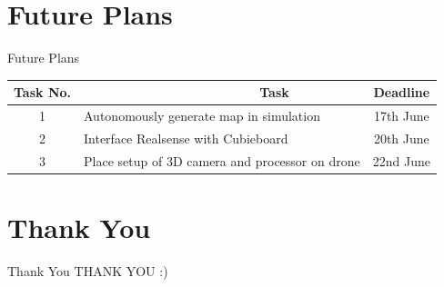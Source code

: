 \documentclass[10pt, a4paper]{beamer}
\begin{document}
\section{Future Plans}
\begin{frame}{Future Plans}
\begin{tabular}{| c | p{6.5cm} | c | }
\hline
Task No. & ~~~~~~~~~~~~~~~~~~~~~~~~Task & Deadline\\
\hline
1 & Autonomously generate map in simulation & 17th June\\
\hline
2 & Interface Realsense with Cubieboard & 20th June\\
\hline
3 & Place setup of 3D camera and processor on drone & 22nd June\\
\hline
\end{tabular}
\end{frame}


\section{Thank You}
\begin{frame}{Thank You}
	\centering THANK YOU :)
\end{frame}
\end{document}
